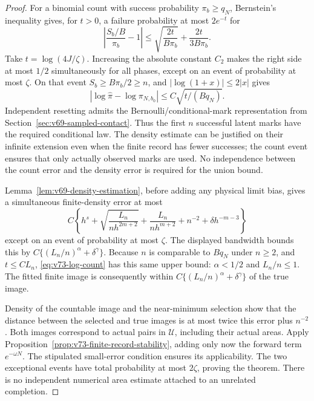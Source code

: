 \begin{proof}
For a binomial count with success probability $\pi_b\ge q_N$,
Bernstein's inequality gives, for $t>0$, a failure probability at most
$2e^{-t}$ for
\[
 \left|\frac{S_b/B}{\pi_b}-1\right|
 \le \sqrt{\frac{2t}{B\pi_b}}+\frac{2t}{3B\pi_b}.
\]
Take $t=\log(4J/\zeta)$.  Increasing the absolute constant $C_2$
makes the right side at most $1/2$ simultaneously for all phases,
except on an event of probability at most $\zeta$.  On that event
$S_b\ge B\pi_b/2\ge n$, and $|\log(1+x)|\le2|x|$ gives
\begin{equation}\label{eq:v73-log-count}
 |\log\widehat\pi-\log\pi_{N,b_0}|
                \le C\sqrt{t/(Bq_N)}.
\end{equation}
Independent resetting admits the Bernoulli/conditional-mark
representation from Section~\ref{sec:v69-sampled-contact}.  Thus the
first $n$ successful latent marks have the required conditional law.
The density estimate can be justified on their infinite extension even
when the finite record has fewer successes; the count event ensures
that only actually observed marks are used.  No independence between
the count error and the density error is required for the union bound.

Lemma~\ref{lem:v69-density-estimation}, before adding any physical
limit bias, gives a simultaneous finite-density error at most
\[
 C\left\{h^s+\sqrt{\frac{L_n}{nh^{2m+2}}}
       +\frac{L_n}{nh^{m+2}}+n^{-2}+\delta h^{-m-3}\right\}
\]
except on an event of probability at most $\zeta$.
The displayed bandwidth bounds this by
$C\{(L_n/n)^\alpha+\delta^\gamma\}$.
Because $n$ is comparable to $Bq_N$ under $n\ge2$, and $t\le CL_n$,
\eqref{eq:v73-log-count} has this same upper bound: $\alpha<1/2$
and $L_n/n\le1$.  The fitted finite image is consequently within
$C\{(L_n/n)^\alpha+\delta^\gamma\}$ of the true image.

Density of the countable image and the near-minimum selection show that
the distance between the selected and true images is at most twice this
error plus $n^{-2}$.  Both images correspond to actual pairs in
$\mathscr U$, including their actual areas.  Apply
Proposition~\ref{prop:v73-finite-record-stability}, adding only now
the forward term $e^{-\omega N}$.  The stipulated small-error condition
ensures its applicability.  The two exceptional events have total
probability at most $2\zeta$, proving the theorem.  There is no
independent numerical area estimate attached to an unrelated completion.
\end{proof}

